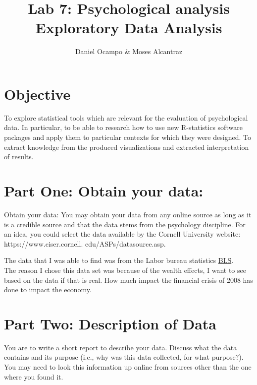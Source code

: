 \documentclass[11pt]{article}
\begin{document}
%
\author{Daniel Ocampo \& Moses Alcantraz}
\title{Lab 7: Psychological analysis  Exploratory Data Analysis}
\maketitle

\section{Objective}
To explore statistical tools which are relevant for the evaluation of psychological data. In particular,
to be able to research how to use new R-statistics software packages and apply them to particular
contexts for which they were designed. To extract knowledge from the produced visualizations and
extracted interpretation of results.


\section{Part One: Obtain your data:}

Obtain your data: You may obtain your data from any online source as long as it is a
credible source and that the data stems from the psychology discipline. For an idea, you could
select the data available by the Cornell University website: https://www.ciser.cornell.
edu/ASPs/datasource.asp.


The data that I was able to find was from the Labor bureau statistics \href{https://www.bls.gov/cex/csxstnd.htm#2010}{BLS}.\\ The reason I chose this data set was because of the wealth effects, I want to see based on the data if that is real. How much impact the financial crisis of 2008 has done to impact  the economy. 





\section{Part Two: Description of Data}

You are to write a short report to describe your data. Discuss what
the data contains and its purpose (i.e., why was this data collected, for what purpose?). You
may need to look this information up online from sources other than the one where you found
it.
\end{document}
